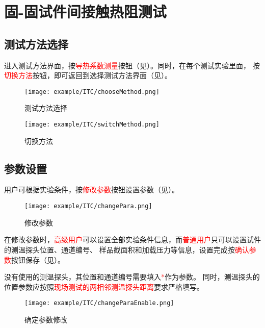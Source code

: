 \section{固-固试件间接触热阻测试}
\subsection{测试方法选择}
进入测试方法界面，按\textcolor{red}{导热系数测量}按钮（见）。同时，在每个测试实验里面，
按\textcolor{red}{切换方法}按钮，即可返回到选择测试方法界面（见）。
\begin{figure}[H]
	\centering
	\texttt{[image: example/ITC/chooseMethod.png]}
	\caption{ 测试方法选择 \label{fig:exmp_itc_chooseMethod}}
\end{figure}

\begin{figure}[H]
	\centering
	\texttt{[image: example/ITC/switchMethod.png]}
	\caption{ 切换方法 \label{fig:exmp_itc_switchMethod}}
\end{figure}

\subsection{参数设置}
用户可根据实验条件，按\textcolor{red}{修改参数}按钮设置参数（见）。
\begin{figure}[H]
	\centering
	\texttt{[image: example/ITC/changePara.png]}
	\caption{ 修改参数 \label{fig:exmp_itc_changePara}}
\end{figure}
在修改参数时，\textcolor{red}{高级用户}可以设置全部实验条件信息，而\textcolor{red}{普通用户}只可以设置试件的测温探头位置、通道编号、
样品截面积和加载压力等信息，设置完成按\textcolor{red}{确认参数}按钮保存（见）。
\begin{note}
没有使用的测温探头，其位置和通道编号需要填入\textcolor{red}{*}作为参数。
同时，测温探头的位置参数应按照\textcolor{red}{现场测试的两相邻测温探头距离}要求严格填写。
\end{note}
\begin{figure}[H]
	\centering
	\texttt{[image: example/ITC/changeParaEnable.png]}
	\caption{ 确定参数修改 \label{fig:exmp_itc_changeParaEnable}}
\end{figure}

